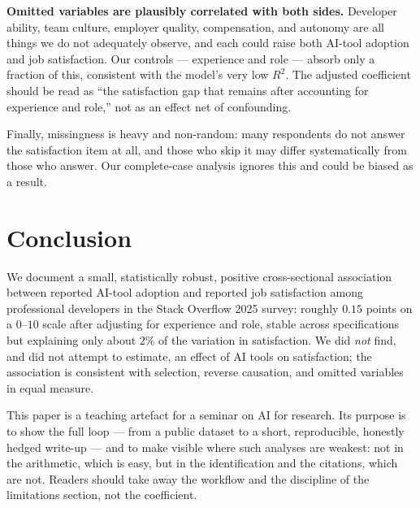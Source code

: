 \documentclass[11pt]{article}
\begin{document}
\textbf{Omitted variables are plausibly correlated with both sides.}
Developer ability, team culture, employer quality, compensation, and
autonomy are all things we do not adequately observe, and each could raise
both AI-tool adoption and job satisfaction. Our controls --- experience and
role --- absorb only a fraction of this, consistent with the model's very
low $R^2$. The adjusted coefficient should be read as ``the satisfaction
gap that remains after accounting for experience and role,'' not as an
effect net of confounding.

Finally, missingness is heavy and non-random: many respondents do not
answer the satisfaction item at all, and those who skip it may differ
systematically from those who answer. Our complete-case analysis ignores
this and could be biased as a result.

\section{Conclusion}
We document a small, statistically robust, positive cross-sectional
association between reported AI-tool adoption and reported job satisfaction
among professional developers in the Stack Overflow 2025 survey: roughly
$0.15$ points on a $0$--$10$ scale after adjusting for experience and role,
stable across specifications but explaining only about $2\%$ of the
variation in satisfaction. We did \emph{not} find, and did not attempt to
estimate, an effect of AI tools on satisfaction; the association is
consistent with selection, reverse causation, and omitted variables in
equal measure.

This paper is a teaching artefact for a seminar on AI for research. Its
purpose is to show the full loop --- from a public dataset to a short,
reproducible, honestly hedged write-up --- and to make visible where such
analyses are weakest: not in the arithmetic, which is easy, but in the
identification and the citations, which are not. Readers should take away
the workflow and the discipline of the limitations section, not the
coefficient.



\end{document}
